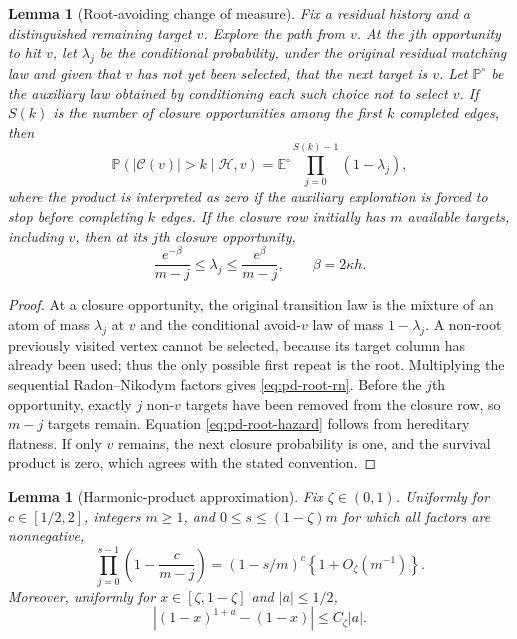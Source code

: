 \documentclass[11pt]{article}
\newtheorem{lemma}[theorem]{Lemma}
\theoremstyle{remark}
\newcommand{\Pp}{\mathbb P}
\newcommand{\Ee}{\mathbb E}
\begin{document}
\begin{lemma}[Root-avoiding change of measure]
\label{lem:pd-root-avoiding}
Fix a residual history and a distinguished remaining target $v$.  Explore the
path from $v$.  At the $j$th opportunity to hit $v$, let $\lambda_j$ be the
conditional probability, under the original residual matching law and given
that $v$ has not yet been selected, that the next target is $v$.  Let
$\Pp^\circ$ be the auxiliary law obtained by conditioning each such choice not
to select $v$.  If $S(k)$ is the number of closure opportunities among the
first $k$ completed edges, then
\begin{equation}
        \Pp(|\mathcal C(v)|>k\mid\mathcal H,v)
        =\Ee^\circ\prod_{j=0}^{S(k)-1}(1-\lambda_j),
 \label{eq:pd-root-rn}
\end{equation}
where the product is interpreted as zero if the auxiliary exploration is
forced to stop before completing $k$ edges.  If the closure row initially has
$m$ available targets, including $v$, then at its $j$th closure opportunity,
\begin{equation}
        \frac{e^{-\beta}}{m-j}\le\lambda_j\le
        \frac{e^\beta}{m-j},
        \qquad \beta=2\kappa h.
 \label{eq:pd-root-hazard}
\end{equation}
\end{lemma}

\begin{proof}
At a closure opportunity, the original transition law is the mixture of an
atom of mass $\lambda_j$ at $v$ and the conditional avoid-$v$ law of mass
$1-\lambda_j$.  A non-root previously visited vertex cannot be selected,
because its target column has already been used; thus the only possible first
repeat is the root.  Multiplying the sequential Radon--Nikodym factors gives
\eqref{eq:pd-root-rn}.  Before the $j$th opportunity, exactly $j$ non-$v$
targets have been removed from the closure row, so $m-j$ targets remain.
Equation \eqref{eq:pd-root-hazard} follows from hereditary flatness.  If only
$v$ remains, the next closure probability is one, and the survival product is
zero, which agrees with the stated convention.
\end{proof}

\begin{lemma}[Harmonic-product approximation]
\label{lem:pd-harmonic-product}
Fix $\zeta\in(0,1)$.  Uniformly for $c\in[1/2,2]$, integers $m\ge1$, and
$0\le s\le(1-\zeta)m$ for which all factors are nonnegative,
\[
 \prod_{j=0}^{s-1}\left(1-\frac c{m-j}\right)
 =(1-s/m)^c\left\{1+O_\zeta(m^{-1})\right\}.
\]
Moreover, uniformly for $x\in[\zeta,1-\zeta]$ and $|a|\le1/2$,
\[
        |(1-x)^{1+a}-(1-x)|\le C_\zeta|a|.
\]
\end{lemma}
\end{document}
